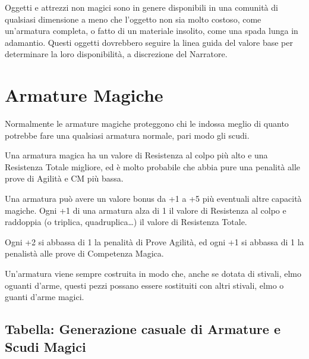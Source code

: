\documentclass[a4paper,11pt,twoside,openany]{book}
\begin{document}
{Oggetti e attrezzi non magici sono in genere disponibili in una comunità di qualsiasi dimensione a meno che l'oggetto non sia molto costoso, come un'armatura completa, o fatto di un materiale insolito, come una spada lunga in adamantio. Questi oggetti dovrebbero seguire la linea guida del valore base per determinare la loro disponibilità, a discrezione del Narratore.

\pagebreak

\section{Armature Magiche}

\label{armature-magiche}

Normalmente le armature magiche proteggono chi le indossa meglio di quanto potrebbe fare una qualsiasi armatura normale, pari modo gli scudi.

Una armatura magica ha un valore di Resistenza al colpo più alto e una Resistenza Totale migliore, ed è molto probabile che abbia pure una penalità alle prove di Agilità e CM più bassa.

Una armatura può avere un valore bonus da +1 a +5 più eventuali altre capacità magiche. Ogni +1 di una armatura alza di 1 il valore di Resistenza al colpo e raddoppia (o triplica, quadruplica\ldots ) il valore di Resistenza Totale.

Ogni +2 si abbassa di 1 la penalità di Prove Agilità, ed ogni +1 si abbassa di 1 la penalistà alle prove di Competenza Magica.

Un'armatura viene sempre costruita in modo che, anche se dotata di stivali, elmo oguanti d'arme, questi pezzi possano essere sostituiti con altri stivali, elmo o guanti d'arme magici.


\subsection{Tabella: Generazione casuale di Armature e Scudi Magici}

\label{tabella-generazione-casuale-di-armature-e-scudi-magici}

}
\end{document}
